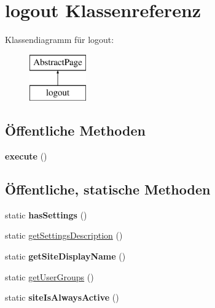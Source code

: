 \hypertarget{classlogout}{}\section{logout Klassenreferenz}
\label{classlogout}
Klassendiagramm für logout\+:\begin{figure}[H]
\begin{center}
\leavevmode
\includegraphics[height=2.000000cm]{classlogout}
\end{center}
\end{figure}
\subsection*{Öffentliche Methoden}
\begin{DoxyCompactItemize}
\item 
\mbox{\label{classlogout_a1b4049fcb8aadf1105135559f5fbeb41}} 
{\bfseries execute} ()
\end{DoxyCompactItemize}
\subsection*{Öffentliche, statische Methoden}
\begin{DoxyCompactItemize}
\item 
\mbox{\label{classlogout_ab899b50e60f33110b13f4967571b2ffe}} 
static {\bfseries has\+Settings} ()
\item 
static \mbox{\hyperlink{classlogout_a85a712a3d758d4da442b56db43327da7}{get\+Settings\+Description}} ()
\item 
\mbox{\label{classlogout_a4eb5d6dea265d9d598fa6235801c6bae}} 
static {\bfseries get\+Site\+Display\+Name} ()
\item 
static \mbox{\hyperlink{classlogout_ad0c9921800fa15d7a2755774b8d2f947}{get\+User\+Groups}} ()
\item 
\mbox{\label{classlogout_abaa38dfed64ad90b520baadc1a4947aa}} 
static {\bfseries site\+Is\+Always\+Active} ()
\end{DoxyCompactItemize}
